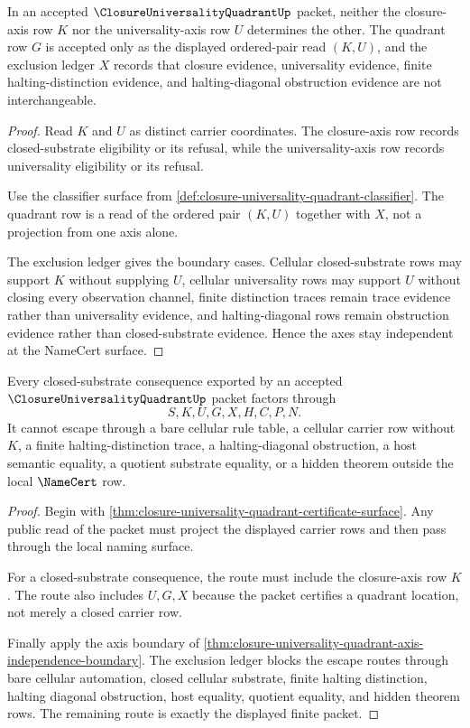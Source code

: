 \begin{theorem}
\label{thm:closure-universality-quadrant-axis-independence-boundary}
In an accepted $\ClosureUniversalityQuadrantUp$ packet, neither the closure-axis row $K$ nor the universality-axis row $U$ determines the other. The quadrant row $G$ is accepted only as the displayed ordered-pair read $(K,U)$, and the exclusion ledger $X$ records that closure evidence, universality evidence, finite halting-distinction evidence, and halting-diagonal obstruction evidence are not interchangeable.
\end{theorem}
\begin{proof}
Read $K$ and $U$ as distinct carrier coordinates. The closure-axis row records closed-substrate eligibility or its refusal, while the universality-axis row records universality eligibility or its refusal.

Use the classifier surface from \autoref{def:closure-universality-quadrant-classifier}. The quadrant row is a read of the ordered pair $(K,U)$ together with $X$, not a projection from one axis alone.

The exclusion ledger gives the boundary cases. Cellular closed-substrate rows may support $K$ without supplying $U$, cellular universality rows may support $U$ without closing every observation channel, finite distinction traces remain trace evidence rather than universality evidence, and halting-diagonal rows remain obstruction evidence rather than closed-substrate evidence. Hence the axes stay independent at the NameCert surface.
\end{proof}

\begin{theorem}
\label{thm:closure-universality-quadrant-closed-substrate-nonescape}
Every closed-substrate consequence exported by an accepted $\ClosureUniversalityQuadrantUp$ packet factors through
$$
S,K,U,G,X,H,C,P,N .
$$
It cannot escape through a bare cellular rule table, a cellular carrier row without $K$, a finite halting-distinction trace, a halting-diagonal obstruction, a host semantic equality, a quotient substrate equality, or a hidden theorem outside the local $\NameCert$ row.
\end{theorem}
\begin{proof}
Begin with \autoref{thm:closure-universality-quadrant-certificate-surface}. Any public read of the packet must project the displayed carrier rows and then pass through the local naming surface.

For a closed-substrate consequence, the route must include the closure-axis row $K$. The route also includes $U,G,X$ because the packet certifies a quadrant location, not merely a closed carrier row.

Finally apply the axis boundary of \autoref{thm:closure-universality-quadrant-axis-independence-boundary}. The exclusion ledger blocks the escape routes through bare cellular automation, closed cellular substrate, finite halting distinction, halting diagonal obstruction, host equality, quotient equality, and hidden theorem rows. The remaining route is exactly the displayed finite packet.
\end{proof}

